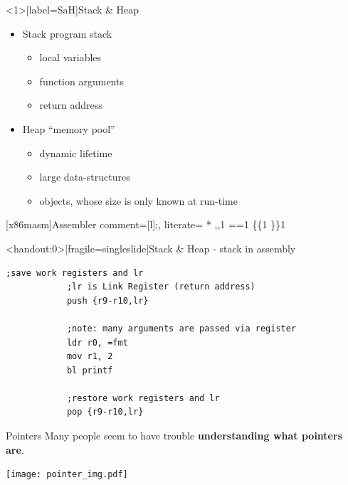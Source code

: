 	\begin{frame}[label=SaH]{Stack \& Heap}
		\begin{itemize}
			\item Stack \rarrow program stack
			\begin{itemize}
				\item local variables
				\item function arguments
				\item return address
			\end{itemize}
			
			\pause
			
			\item Heap \rarrow ``memory pool''
			\begin{itemize}
				\item dynamic lifetime
				\item large data-structures 
				\item objects, whose size is only known at run-time 
			\end{itemize}
		\end{itemize}
	\end{frame}
	
	[x86masm]{Assembler}{
		comment=[l]{;},
		literate=%
			*
			{,}{{{\color[rgb]{0.07,0.07,0.07},}}}1
			{=}{{{\color[rgb]{0.2,0.2,0.2}=}}}1
			{\{}{{{\color[rgb]{0.2,0.2,0.2}\{}}}1
			{\}}{{{\color[rgb]{0.2,0.2,0.2}\}}}}1
	}
	\begin{frame}<handout:0>[fragile=singleslide]{Stack \& Heap - stack in assembly}
		\begin{lstlisting}[language={[ARMv8]Assembler},gobble=12]
			;save work registers and lr
			;lr is Link Register (return address)
			push {r9-r10,lr}
			
			;note: many arguments are passed via register
			ldr r0, =fmt
			mov r1, 2
			bl printf
			
			;restore work registers and lr
			pop {r9-r10,lr}
		\end{lstlisting}
	\end{frame}
	
	
	\begin{frame}{Pointers}
		Many people seem to have trouble \textbf{understanding what pointers are}.
		
		\begin{center}
			\texttt{[image: pointer\_img.pdf]}
		\end{center}
		
	\end{frame}
	
